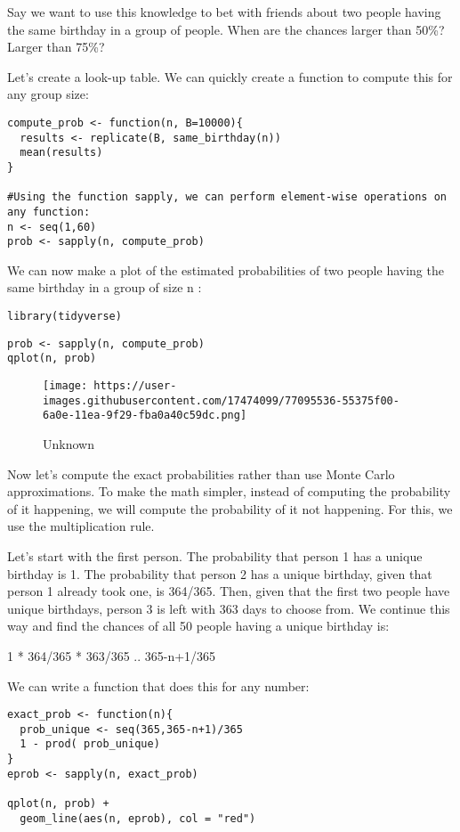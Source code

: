\documentclass[
]{article}
\begin{document}
Say we want to use this knowledge to bet with friends about two people
having the same birthday in a group of people. When are the chances
larger than 50\%? Larger than 75\%?

Let's create a look-up table. We can quickly create a function to
compute this for any group size:

\begin{verbatim}
compute_prob <- function(n, B=10000){
  results <- replicate(B, same_birthday(n))
  mean(results)
}

#Using the function sapply, we can perform element-wise operations on any function:
n <- seq(1,60)
prob <- sapply(n, compute_prob)
\end{verbatim}

We can now make a plot of the estimated probabilities of two people
having the same birthday in a group of size n :

\begin{verbatim}
library(tidyverse)
\end{verbatim}

\begin{verbatim}
prob <- sapply(n, compute_prob)
qplot(n, prob)
\end{verbatim}

\begin{figure}
\centering
\texttt{[image: https://user-images.githubusercontent.com/17474099/77095536-55375f00-6a0e-11ea-9f29-fba0a40c59dc.png]}
\caption{Unknown}
\end{figure}

Now let's compute the exact probabilities rather than use Monte Carlo
approximations. To make the math simpler, instead of computing the
probability of it happening, we will compute the probability of it not
happening. For this, we use the multiplication rule.

Let's start with the first person. The probability that person 1 has a
unique birthday is 1. The probability that person 2 has a unique
birthday, given that person 1 already took one, is 364/365. Then, given
that the first two people have unique birthdays, person 3 is left with
363 days to choose from. We continue this way and find the chances of
all 50 people having a unique birthday is:

1 * 364/365 * 363/365 .. 365-n+1/365

We can write a function that does this for any number:

\begin{verbatim}
exact_prob <- function(n){
  prob_unique <- seq(365,365-n+1)/365 
  1 - prod( prob_unique)
}
eprob <- sapply(n, exact_prob)

qplot(n, prob) + 
  geom_line(aes(n, eprob), col = "red")
\end{verbatim}
\end{document}
